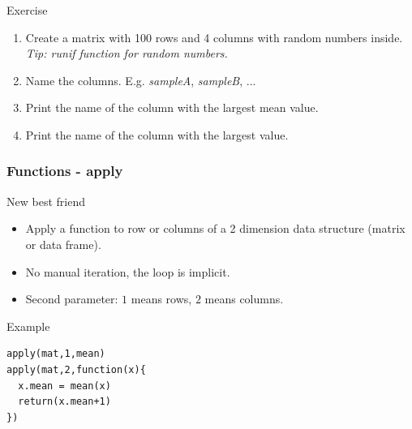 \documentclass[10pt]{beamer}
\newenvironment{xframe}[2][]
  {\begin{frame}[fragile,environment=xframe,#1]
  \frametitle{#2}}
  {\end{frame}}
\begin{document}

\begin{frame}{Exercise}
  \begin{enumerate}
  \item Create a {\sf matrix} with 100 rows and 4 columns with random numbers inside. {\scriptsize\it Tip: {\sf runif} function for random numbers.}
  \item Name the columns. E.g. {\it sampleA}, {\it sampleB}, ...
  \item Print the name of the column with the largest mean value.
  \item Print the name of the column with the largest value.
  \end{enumerate}
\end{frame}


\begin{xframe}{Functions - {\sf apply}}
  \begin{block}{New best friend}
    \begin{itemize}
    \item Apply a function to row or columns of a 2 dimension data structure ({\sf matrix} or data frame).
    \item No manual iteration, the loop is implicit.
    \item Second parameter: $1$ means rows, $2$ means columns.
    \end{itemize}
  \end{block}
  \begin{exampleblock}{Example}
\begin{verbatim}
apply(mat,1,mean)
apply(mat,2,function(x){
  x.mean = mean(x)
  return(x.mean+1)
})
\end{verbatim}  
  \end{exampleblock}
\end{xframe}

\end{document}
